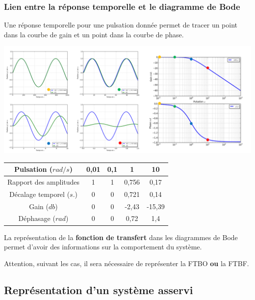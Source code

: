 \documentclass[10pt,oneside]{article}
\begin{document}
\subsubsection{Lien entre la réponse temporelle et le diagramme de Bode}
Une réponse temporelle pour une pulsation donnée permet de tracer un point dans la courbe de gain et un point dans la courbe de phase.
\begin{center}
\includegraphics[width=\textwidth]{png/temp_bode}
\end{center}

\begin{center}
\begin{tabular}{|c|c|c|c|c|}
\hline
Pulsation ($rad/s$) & 0,01 & 0,1 & 1 & 10\\
\hline
Rapport des amplitudes & 1 & 1 & 0,756 & 0,17 \\
\hline
Décalage temporel ($s.$) & 0 & 0 &0,721  &0,14  \\
\hline
Gain ($db$) & 0 & 0 & -2,43 %
& -15,39 %
\\
\hline
Déphasage ($rad$) & 0 & 0 & 0,72 & 1,4\\
\hline
\end{tabular}
\end{center}
% 


\begin{resultat}
La représentation de la \textbf{fonction de transfert} dans les diagrammes de Bode permet d'avoir des informations sur la comportement du système. 

Attention, suivant les cas, il sera nécessaire de représenter la FTBO \textbf{ou} la FTBF.
\end{resultat}
\subsection{Représentation d'un système asservi}
\end{document}
